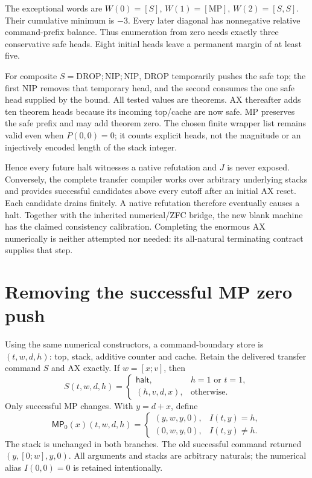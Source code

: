 \documentclass[11pt]{article}
\newcommand{\MP}{\mathsf{MP}_0}
\begin{document}
The exceptional words are $W(0)=[S]$, $W(1)=[\mathrm{MP}]$, $W(2)=[S,S]$. Their cumulative minimum is $-3$. Every later diagonal has nonnegative relative command-prefix balance. Thus enumeration from zero needs exactly three conservative safe heads. Eight initial heads leave a permanent margin of at least five.

For composite $S=\mathrm{DROP};\mathrm{NIP};\mathrm{NIP}$, DROP temporarily pushes the safe top; the first NIP removes that temporary head, and the second consumes the one safe head supplied by the bound. All tested values are theorems. AX thereafter adds ten theorem heads because its incoming top/cache are now safe. MP preserves the safe prefix and may add theorem zero. The chosen finite wrapper list remains valid even when $P(0,0)=0$; it counts explicit heads, not the magnitude or an injectively encoded length of the stack integer.

Hence every future halt witnesses a native refutation and $J$ is never exposed. Conversely, the complete transfer compiler works over arbitrary underlying stacks and provides successful candidates above every cutoff after an initial AX reset. Each candidate drains finitely. A native refutation therefore eventually causes a halt. Together with the inherited numerical/ZFC bridge, the new blank machine has the claimed consistency calibration. Completing the enormous AX numerically is neither attempted nor needed: its all-natural terminating contract supplies that step.

\section{Removing the successful MP zero push}
Using the same numerical constructors, a command-boundary store is $(t,w,d,h)$: top, stack, additive counter and cache. Retain the delivered transfer command $S$ and AX exactly. If $w=[x;v]$, then
\[
 S(t,w,d,h)=\begin{cases}\mathsf{halt},&h=1\text{ or }t=1,\\
 (h,v,d,x),&\text{otherwise}.
 \end{cases}
\]
Only successful MP changes. With $y=d+x$, define
\[
 \MP(x)(t,w,d,h)=
 \begin{cases}
  (y,w,y,0),&I(t,y)=h,\\
  (0,w,y,0),&I(t,y)\ne h.
 \end{cases}
\]
The stack is unchanged in both branches. The old successful command returned $(y,[0;w],y,0)$. All arguments and stacks are arbitrary naturals; the numerical alias $I(0,0)=0$ is retained intentionally.
\end{document}
